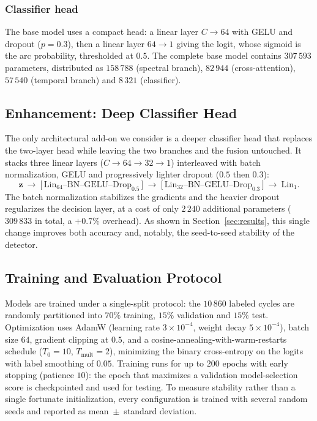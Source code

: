 \documentclass[journal,article,submit,moreauthors]{Definitions/mdpi}
\begin{document}
\subsubsection{Classifier head}
The base model uses a compact head: a linear layer $C\!\to\!64$ with GELU and dropout ($p=0.3$), then a linear layer $64\!\to\!1$ giving the logit, whose sigmoid is the arc probability, thresholded at $0.5$. The complete base model contains $307\,593$ parameters, distributed as $158\,788$ (spectral branch), $82\,944$ (cross-attention), $57\,540$ (temporal branch) and $8\,321$ (classifier).

\subsection{Enhancement: Deep Classifier Head}
\label{sec:deepclf}

The only architectural add-on we consider is a deeper classifier head that replaces the two-layer head while leaving the two branches and the fusion untouched. It stacks three linear layers ($C\!\to\!64\!\to\!32\!\to\!1$) interleaved with batch normalization, GELU and progressively lighter dropout ($0.5$ then $0.3$):
\begin{equation}
\mathbf{z}\ \to\ \big[\,\mathrm{Lin}_{64}\text{–}\mathrm{BN}\text{–}\mathrm{GELU}\text{–}\mathrm{Drop}_{0.5}\,\big]\ \to\ \big[\,\mathrm{Lin}_{32}\text{–}\mathrm{BN}\text{–}\mathrm{GELU}\text{–}\mathrm{Drop}_{0.3}\,\big]\ \to\ \mathrm{Lin}_{1}.
\label{eq:deephead}
\end{equation}
The batch normalization stabilizes the gradients and the heavier dropout regularizes the decision layer, at a cost of only $2\,240$ additional parameters ($309\,833$ in total, a $+0.7\%$ overhead). As shown in Section~\ref{sec:results}, this single change improves both accuracy and, notably, the seed-to-seed stability of the detector.

\subsection{Training and Evaluation Protocol}
\label{sec:training}

Models are trained under a single-split protocol: the $10\,860$ labeled cycles are randomly partitioned into $70\%$ training, $15\%$ validation and $15\%$ test. Optimization uses AdamW (learning rate $3\times10^{-4}$, weight decay $5\times10^{-4}$), batch size $64$, gradient clipping at $0.5$, and a cosine-annealing-with-warm-restarts schedule ($T_{0}=10$, $T_{\mathrm{mult}}=2$), minimizing the binary cross-entropy on the logits with label smoothing of $0.05$. Training runs for up to $200$ epochs with early stopping (patience $10$): the epoch that maximizes a validation model-selection score is checkpointed and used for testing. To measure stability rather than a single fortunate initialization, every configuration is trained with several random seeds and reported as mean~$\pm$~standard deviation.
\end{document}
